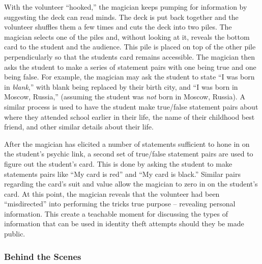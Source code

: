 With the volunteer ``hooked,'' the magician keeps pumping for information by
suggesting the deck can read minds.
The deck is put back together
and the volunteer shuffles them
a few times and cuts the deck into two piles.
The magician
selects one of the piles and, without looking at it,
reveals the bottom card to the student and the
audience.
This pile is placed on top of the other pile perpendicularly so that
the students card remains accessible.  The magician then asks the student to
make a series of statement pairs with one being true and one being false.  For
example,  the magician may ask the student to state  ``I was born in
\textit{blank},'' with blank being replaced by their birth city, and ``I was
born in Moscow, Russia,'' (assuming the student was \textit{not} born in Moscow,
Russia).  A similar process is used to have the student make true/false
statement pairs about where they attended school earlier in their life, the name
of their childhood best friend, and other similar details about their life.

After the magician has elicited a number of statements sufficient to hone in on
the student's psychic link, a second set of true/false statement pairs are used
to figure out the student's card.  This is done by asking the student to make
statements pairs like ``My card is red'' and ``My card is black.''  Similar
pairs regarding the card's suit and value allow the magician to zero
in on the student's card.
At this point, the magician reveals that the volunteer had been
``misdirected'' into performing the tricks true purpose -- revealing
personal information.  This create a teachable moment for discussing
the types of information that can be used in identity theft attempts
should they
be made public.


\subsubsection{Behind the Scenes}

